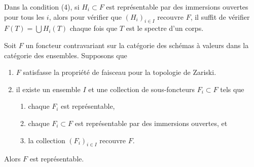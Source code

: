 \noindent
Dans la condition (4), si $H_i \subset F$ est représentable par des immersions ouvertes
pour tous les $i$, alors pour vérifier que $(H_i)_{i \in I}$ recouvre $F$, il suffit
de vérifier $F(T) = \bigcup H_i(T)$ chaque fois que $T$ est le spectre d'un corps.

\begin{lemma}
\label{lemma-glue-functors}
Soit $F$ un foncteur contravariant sur la catégorie des schémas à
valeurs dans la catégorie des ensembles. Supposons que
\begin{enumerate}
\item $F$ satisfasse la propriété de faisceau pour la topologie de Zariski.
\item il existe un ensemble $I$ et une collection de sous-foncteurs
$F_i \subset F$ tels que
\begin{enumerate}
\item chaque $F_i$ est représentable,
\item chaque $F_i \subset F$ est représentable par des immersions ouvertes,
et \item la collection $(F_i)_{i \in I}$ recouvre $F$.
\end{enumerate}
\end{enumerate}
Alors $F$ est représentable.
\end{lemma}

